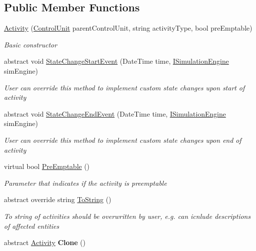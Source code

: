 \subsection*{Public Member Functions}
\begin{DoxyCompactItemize}
\item 
\hyperlink{class_simulation_core_1_1_h_c_c_m_elements_1_1_activity_a469c418718e6964496533937b3e17d0e}{Activity} (\hyperlink{class_simulation_core_1_1_h_c_c_m_elements_1_1_control_unit}{Control\+Unit} parent\+Control\+Unit, string activity\+Type, bool pre\+Emptable)
\begin{DoxyCompactList}\small\item\em Basic constructor \end{DoxyCompactList}\item 
abstract void \hyperlink{class_simulation_core_1_1_h_c_c_m_elements_1_1_activity_a9e32419af17c068770913cbb35404bec}{State\+Change\+Start\+Event} (Date\+Time time, \hyperlink{interface_simulation_core_1_1_simulation_classes_1_1_i_simulation_engine}{I\+Simulation\+Engine} sim\+Engine)
\begin{DoxyCompactList}\small\item\em User can override this method to implement custom state changes upon start of activity \end{DoxyCompactList}\item 
abstract void \hyperlink{class_simulation_core_1_1_h_c_c_m_elements_1_1_activity_a953060c6df5ca827212dacfd3849d64a}{State\+Change\+End\+Event} (Date\+Time time, \hyperlink{interface_simulation_core_1_1_simulation_classes_1_1_i_simulation_engine}{I\+Simulation\+Engine} sim\+Engine)
\begin{DoxyCompactList}\small\item\em User can override this method to implement custom state changes upon end of activity \end{DoxyCompactList}\item 
virtual bool \hyperlink{class_simulation_core_1_1_h_c_c_m_elements_1_1_activity_ab0c6cf3bd9f7d9db9ca037ae4de77a5c}{Pre\+Emptable} ()
\begin{DoxyCompactList}\small\item\em Parameter that indicates if the activity is preemptable \end{DoxyCompactList}\item 
abstract override string \hyperlink{class_simulation_core_1_1_h_c_c_m_elements_1_1_activity_a352124cf18f8505e51c8847a71769f7d}{To\+String} ()
\begin{DoxyCompactList}\small\item\em To string of activities should be overwritten by user, e.\+g. can icnlude descriptions of affected entities \end{DoxyCompactList}\item 
abstract \hyperlink{class_simulation_core_1_1_h_c_c_m_elements_1_1_activity}{Activity} {\bfseries Clone} ()\hypertarget{class_simulation_core_1_1_h_c_c_m_elements_1_1_activity_a2f8a2c5e20dedec597be72e2af5d86b6}{}\label{class_simulation_core_1_1_h_c_c_m_elements_1_1_activity_a2f8a2c5e20dedec597be72e2af5d86b6}

\end{DoxyCompactItemize}
